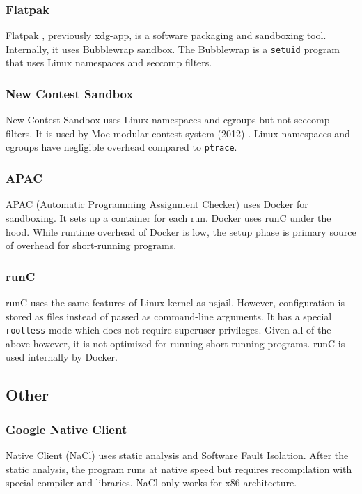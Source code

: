 \documentclass[en]{pracamgr}
\begin{document}
\subsubsection{Flatpak}
Flatpak \cite{flatpak}, previously xdg-app, is a software packaging and sandboxing tool. Internally, it uses Bubblewrap sandbox. The Bubblewrap \cite{bubblewrap} is a \texttt{setuid} \cite{man_setuid} program that uses Linux namespaces and seccomp filters.

\subsubsection{New Contest Sandbox}
New Contest Sandbox \cite{marevs2012new} uses Linux namespaces and cgroups but not seccomp filters. It is used by Moe modular contest system (2012) \cite{marevs2012new}. Linux namespaces and cgroups have negligible overhead compared to \texttt{ptrace}.

\subsubsection{APAC}
APAC (Automatic Programming Assignment Checker) \cite{SPACEK20151665} uses Docker for sandboxing. It sets up a container for each run. Docker uses runC under the hood. While runtime overhead of Docker is low, the setup phase is primary source of overhead for short-running programs.

\subsubsection{runC}
runC \cite{cochak2021runc} uses the same features of Linux kernel as nsjail. However, configuration is stored as files instead of passed as command-line arguments. It has a special \texttt{rootless} mode which does not require superuser privileges. Given all of the above however, it is not optimized for running short-running programs. runC is used internally by Docker.

\subsection{Other}

\subsubsection{Google Native Client}
Native Client (NaCl) \cite{yee2010native} uses static analysis and Software Fault Isolation. After the static analysis, the program runs at native speed but requires recompilation with special compiler and libraries. NaCl only works for x86 architecture.
\end{document}
